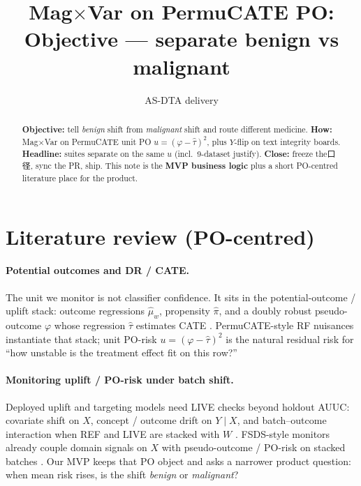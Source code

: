 \documentclass[11pt]{article}
\title{Mag$\times$Var on \textbf{PermuCATE} PO:\\
\large Objective --- separate benign vs malignant}
\author{AS-DTA delivery}
\date{}
\begin{document}
\maketitle

\begin{abstract}
\noindent\textbf{Objective:} tell \emph{benign} shift from \emph{malignant} shift
and route different medicine.
\textbf{How:} Mag$\times$Var on PermuCATE unit PO
$u=(\varphi-\hat\tau)^2$, plus $Y$-flip on text integrity boards.
\textbf{Headline:} suites separate on the same $u$ (incl.\ 9-dataset justify).
\textbf{Close:} freeze the口径, sync the PR, ship.
This note is the \textbf{MVP business logic} plus a short PO-centred
literature place for the product.
\end{abstract}

\section{Literature review (PO-centred)}

\paragraph{Potential outcomes and DR / CATE.}
The unit we monitor is not classifier confidence.
It sits in the potential-outcome / uplift stack:
outcome regressions $\hat\mu_w$, propensity $\hat\pi$, and a doubly robust
pseudo-outcome $\varphi$ whose regression $\hat\tau$ estimates CATE
\cite{rubin1974,robins1994,chernozhukov2018,kennedy2023,athey2019}.
PermuCATE-style RF nuisances instantiate that stack; unit PO-risk
$u=(\varphi-\hat\tau)^2$ is the natural residual risk for
``how unstable is the treatment effect fit on this row?''

\paragraph{Monitoring uplift / PO-risk under batch shift.}
Deployed uplift and targeting models need LIVE checks beyond holdout AUUC:
covariate shift on $X$, concept / outcome drift on $Y\mid X$, and
batch--outcome interaction when REF and LIVE are stacked with $W$
\cite{gama2014,quionero2009}.
FSDS-style monitors already couple domain signals on $X$ with
pseudo-outcome / PO-risk on stacked batches
\cite{monitorupliftfsds}.
Our MVP keeps that PO object and asks a narrower product question:
when mean risk rises, is the shift \emph{benign} or \emph{malignant}?
\end{document}
